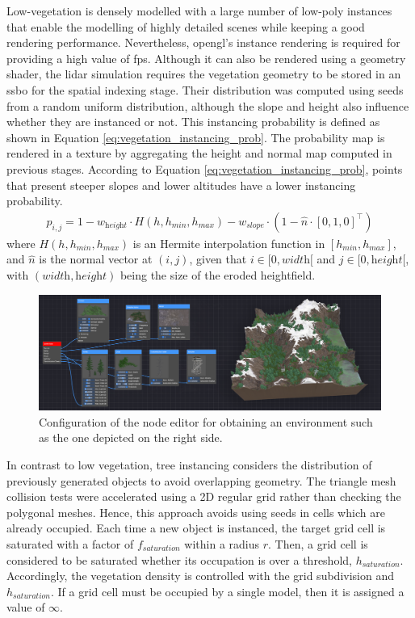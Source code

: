 Low-vegetation is densely modelled with a large number of low-poly instances that enable the modelling of highly detailed scenes while keeping a good rendering performance. Nevertheless, \acrshort{opengl}'s instance rendering is required for providing a high value of \acrshort{fps}. Although it can also be rendered using a geometry shader, the \acrshort{lidar} simulation requires the vegetation geometry to be stored in an \acrshort{ssbo} for the spatial indexing stage. Their distribution was computed using seeds from a random uniform distribution, although the slope and height also influence whether they are instanced or not. This instancing probability is defined as shown in Equation \ref{eq:vegetation_instancing_prob}. The probability map is rendered in a texture by aggregating the height and normal map computed in previous stages. According to Equation \ref{eq:vegetation_instancing_prob}, points that present steeper slopes and lower altitudes have a lower instancing probability.
\begin{gather}
    \label{eq:vegetation_instancing_prob}
    p_{i, j} = 1 - w_{\textit{height}} \cdot H(h, h_{\textit{min}}, h_{\textit{max}}) - w_{\textit{slope}} \cdot (1 - \hat{n} \cdot \left[0, 1, 0\right]^\intercal)
\end{gather}
where $H(h, h_{\textit{min}}, h_{\textit{max}})$ is an Hermite interpolation function in $[h_{\textit{min}}, h_{\textit{max}}]$, and $\hat{n}$ is the normal vector at $(i, j)$, given that $i \in [0, \textit{width}[$ and $j \in [0, \textit{height}[$, with $\left(\textit{width}, \textit{height}\right)$ being the size of the eroded heightfield.

\begin{figure}
    \centering
    \includegraphics[width=\linewidth]{figs/lidar_simulation/node_editor.png}
	\caption{Configuration of the node editor for obtaining an environment such as the one depicted on the right side.  }
	\label{fig:node_editor}
\end{figure}

In contrast to low vegetation, tree instancing considers the distribution of previously generated objects to avoid overlapping geometry. The triangle mesh collision tests were accelerated using a 2D regular grid rather than checking the polygonal meshes. Hence, this approach avoids using seeds in cells which are already occupied. Each time a new object is instanced, the target grid cell is saturated with a factor of $f_{\textit{saturation}}$ within a radius $r$. Then, a grid cell is considered to be saturated whether its occupation is over a threshold, $h_{\textit{saturation}}$. Accordingly, the vegetation density is controlled with the grid subdivision and $h_{\textit{saturation}}$. If a grid cell must be occupied by a single model, then it is assigned a value of $\infty$. 

